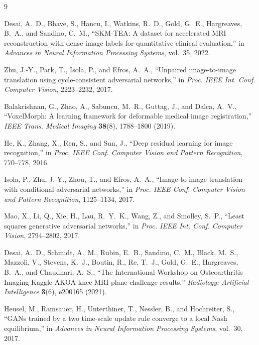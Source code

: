 \documentclass[12pt, a4paper]{article}
\begin{document}

\begin{thebibliography}{9}

Desai, A.~D., Bhave, S., Hancu, I., Watkins, R.~D., Gold, G.~E., Hargreaves, B.~A., and Sandino, C.~M.,
``SKM-TEA: A dataset for accelerated MRI reconstruction with dense image labels for quantitative clinical evaluation,''
in \textit{Advances in Neural Information Processing Systems}, vol.~35, 2022.

Zhu, J.-Y., Park, T., Isola, P., and Efros, A.~A.,
``Unpaired image-to-image translation using cycle-consistent adversarial networks,''
in \textit{Proc. IEEE Int. Conf. Computer Vision}, 2223--2232, 2017.

Balakrishnan, G., Zhao, A., Sabuncu, M.~R., Guttag, J., and Dalca, A.~V.,
``VoxelMorph: A learning framework for deformable medical image registration,''
\textit{IEEE Trans. Medical Imaging} \textbf{38}(8), 1788--1800 (2019).

He, K., Zhang, X., Ren, S., and Sun, J.,
``Deep residual learning for image recognition,''
in \textit{Proc. IEEE Conf. Computer Vision and Pattern Recognition}, 770--778, 2016.

Isola, P., Zhu, J.-Y., Zhou, T., and Efros, A.~A.,
``Image-to-image translation with conditional adversarial networks,''
in \textit{Proc. IEEE Conf. Computer Vision and Pattern Recognition}, 1125--1134, 2017.

Mao, X., Li, Q., Xie, H., Lau, R.~Y.~K., Wang, Z., and Smolley, S.~P.,
``Least squares generative adversarial networks,''
in \textit{Proc. IEEE Int. Conf. Computer Vision}, 2794--2802, 2017.

Desai, A.~D., Schmidt, A.~M., Rubin, E.~B., Sandino, C.~M., Black, M.~S., Mazzoli, V.,
Stevens, K.~J., Boutin, R., Re, T.~J., Gold, G.~E., Hargreaves, B.~A., and Chaudhari, A.~S.,
``The International Workshop on Osteoarthritis Imaging Kaggle AKOA knee MRI plane challenge results,''
\textit{Radiology: Artificial Intelligence} \textbf{3}(6), e200165 (2021).

Heusel, M., Ramsauer, H., Unterthiner, T., Nessler, B., and Hochreiter, S.,
``GANs trained by a two time-scale update rule converge to a local Nash equilibrium,''
in \textit{Advances in Neural Information Processing Systems}, vol.~30, 2017.

\end{thebibliography}
\end{document}
